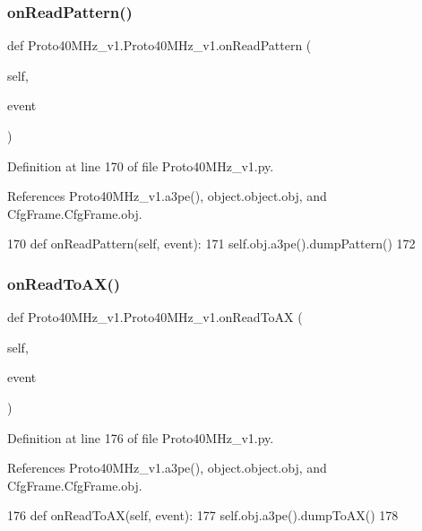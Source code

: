 \subsubsection{\texorpdfstring{on\+Read\+Pattern()}{onReadPattern()}}
{\footnotesize\ttfamily def Proto40\+M\+Hz\+\_\+v1.\+Proto40\+M\+Hz\+\_\+v1.\+on\+Read\+Pattern (\begin{DoxyParamCaption}\item[{}]{self,  }\item[{}]{event }\end{DoxyParamCaption})}



Definition at line 170 of file Proto40\+M\+Hz\+\_\+v1.\+py.



References Proto40\+M\+Hz\+\_\+v1.\+a3pe(), object.\+object.\+obj, and Cfg\+Frame.\+Cfg\+Frame.\+obj.


\begin{DoxyCode}
170     \textcolor{keyword}{def }onReadPattern(self, event):
171         self.obj.a3pe().dumpPattern()
172 
\end{DoxyCode}
\mbox{\label{classProto40MHz__v1_1_1Proto40MHz__v1_ab2d7f48fb96de1a4f7e055d222cd81a7}} 
\subsubsection{\texorpdfstring{on\+Read\+To\+A\+X()}{onReadToAX()}}
{\footnotesize\ttfamily def Proto40\+M\+Hz\+\_\+v1.\+Proto40\+M\+Hz\+\_\+v1.\+on\+Read\+To\+AX (\begin{DoxyParamCaption}\item[{}]{self,  }\item[{}]{event }\end{DoxyParamCaption})}



Definition at line 176 of file Proto40\+M\+Hz\+\_\+v1.\+py.



References Proto40\+M\+Hz\+\_\+v1.\+a3pe(), object.\+object.\+obj, and Cfg\+Frame.\+Cfg\+Frame.\+obj.


\begin{DoxyCode}
176     \textcolor{keyword}{def }onReadToAX(self, event):
177         self.obj.a3pe().dumpToAX()
178 
\end{DoxyCode}
\mbox{\label{classProto40MHz__v1_1_1Proto40MHz__v1_ad09ec450bda96a2afa0416eac0456238}} 

